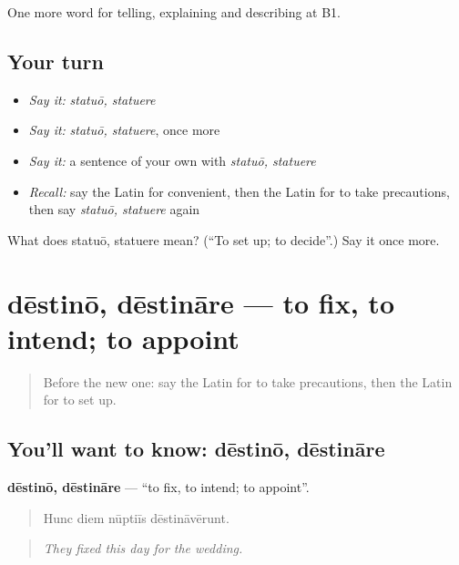 \begin{grammarlens}[title={What you've built}]
One more word for telling, explaining and describing at B1.
\end{grammarlens}

\subsection*{Your turn}
\begin{itemize}
\raggedright
  \item \emph{Say it:} \emph{statuō, statuere}
  \item \emph{Say it:} \emph{statuō, statuere}, once more
  \item \emph{Say it:} a sentence of your own with \emph{statuō, statuere}
  \item \emph{Recall:} say the Latin for convenient, then the Latin for to take precautions, then say \emph{statuō, statuere} again
\end{itemize}

\begin{tcolorbox}[breakable,colback=teal!4,colframe=teal!35!black,title={Before you move on}]
What does statuō, statuere mean? (\textquotedblleft{}To set up; to decide\textquotedblright{}.) Say it once more.
\end{tcolorbox}
\section[dēstinō, dēstināre]{dēstinō, dēstināre — to fix, to intend; to appoint}

\label{lesson:LA-C393-destino}



\begin{quote}
Before the new one: say the Latin for to take precautions, then the Latin for to set up.
\end{quote}

\subsection*{You'll want to know: dēstinō, dēstināre}
\textbf{dēstinō, dēstināre} — \textquotedblleft{}to fix, to intend; to appoint\textquotedblright{}.

\begin{quote}
Hunc diem nūptiīs dēstināvērunt.
\end{quote}

\begin{quote}
\emph{They fixed this day for the wedding.}
\end{quote}

